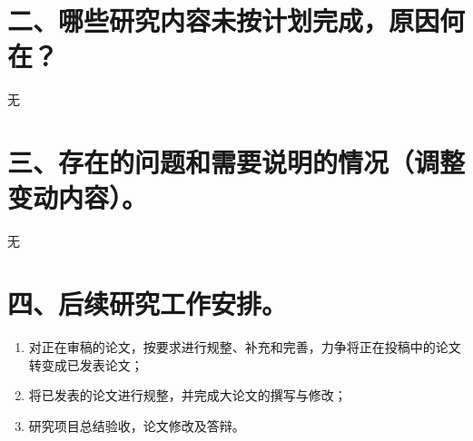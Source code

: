 \documentclass{article}
\begin{document}
\section{二、哪些研究内容未按计划完成，原因何在？}
无

\section{三、存在的问题和需要说明的情况（调整变动内容）。}
无

\section{四、后续研究工作安排。}
\begin{enumerate}
\item 对正在审稿的论文，按要求进行规整、补充和完善，力争将正在投稿中的论文转变成已发表论文；
\item 将已发表的论文进行规整，并完成大论文的撰写与修改；
\item 研究项目总结验收，论文修改及答辩。
\end{enumerate}



\end{document}
